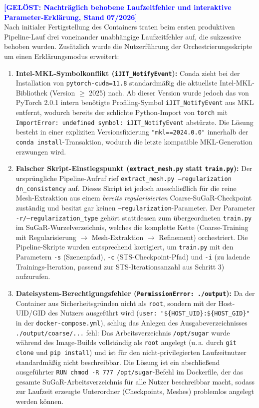 \documentclass[12pt,a4paper]{article}
\begin{document}
\textcolor{blue}{\textbf{[GELÖST: Nachträglich behobene Laufzeitfehler und interaktive Parameter-Erklärung, Stand 07/2026]}}\\
Nach initialer Fertigstellung des Containers traten beim ersten produktiven Pipeline-Lauf drei voneinander unabhängige Laufzeitfehler auf, die sukzessive behoben wurden. Zusätzlich wurde die Nutzerführung der Orchestrierungsskripte um einen Erklärungsmodus erweitert:
\begin{enumerate}[noitemsep]
    \item \textbf{Intel-MKL-Symbolkonflikt (\texttt{iJIT\_NotifyEvent}):} Conda zieht bei der Installation von \texttt{pytorch-cuda=11.8} standardmäßig die aktuellste Intel-MKL-Bibliothek (Version $\geq$ 2025) nach. Ab dieser Version wurde jedoch das von PyTorch 2.0.1 intern benötigte Profiling-Symbol \texttt{iJIT\_NotifyEvent} aus MKL entfernt, wodurch bereits der schlichte Python-Import von \texttt{torch} mit \texttt{ImportError: undefined symbol: iJIT\_NotifyEvent} abstürzte. Die Lösung besteht in einer expliziten Versionsfixierung \texttt{"mkl==2024.0.0"} innerhalb der \texttt{conda install}-Transaktion, wodurch die letzte kompatible MKL-Generation erzwungen wird.
    \item \textbf{Falscher Skript-Einstiegspunkt (\texttt{extract\_mesh.py} statt \texttt{train.py}):} Der ursprüngliche Pipeline-Aufruf rief \texttt{extract\_mesh.py --regularization dn\_consistency} auf. Dieses Skript ist jedoch ausschließlich für die reine Mesh-Extraktion aus einem \textit{bereits regularisierten} Coarse-SuGaR-Checkpoint zuständig und besitzt gar keinen \texttt{--regularization}-Parameter. Der Parameter \texttt{-r/--regularization\_type} gehört stattdessen zum übergeordneten \texttt{train.py} im SuGaR-Wurzelverzeichnis, welches die komplette Kette (Coarse-Training mit Regularisierung $\rightarrow$ Mesh-Extraktion $\rightarrow$ Refinement) orchestriert. Die Pipeline-Skripte wurden entsprechend korrigiert, um \texttt{train.py} mit den Parametern \texttt{-s} (Szenenpfad), \texttt{-c} (STS-Checkpoint-Pfad) und \texttt{-i} (zu ladende Trainings-Iteration, passend zur STS-Iterationsanzahl aus Schritt 3) aufzurufen.
    \item \textbf{Dateisystem-Berechtigungsfehler (\texttt{PermissionError: ./output}):} Da der Container aus Sicherheitsgründen nicht als \texttt{root}, sondern mit der Host-UID/GID des Nutzers ausgeführt wird (\texttt{user: "\$\{HOST\_UID\}:\$\{HOST\_GID\}"} in der \texttt{docker-compose.yml}), schlug das Anlegen des Ausgabeverzeichnisses \texttt{./output/coarse/...} fehl: Das Arbeitsverzeichnis \texttt{/opt/sugar} wurde während des Image-Builds vollständig als \texttt{root} angelegt (u.\,a. durch \texttt{git clone} und \texttt{pip install}) und ist für den nicht-privilegierten Laufzeitnutzer standardmäßig nicht beschreibbar. Die Lösung ist ein abschließend ausgeführter \texttt{RUN chmod -R 777 /opt/sugar}-Befehl im Dockerfile, der das gesamte SuGaR-Arbeitsverzeichnis für alle Nutzer beschreibbar macht, sodass zur Laufzeit erzeugte Unterordner (Checkpoints, Meshes) problemlos angelegt werden können.

\end{enumerate}
\end{document}

